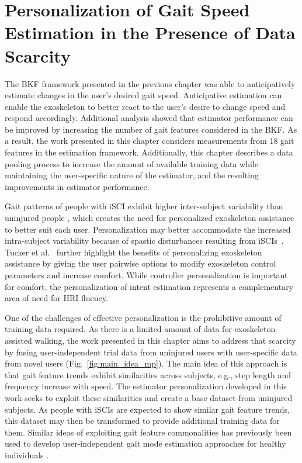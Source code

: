 \chapter{Personalization of Gait Speed Estimation in the Presence of Data Scarcity}\label{chapter:MP}

The BKF framework presented in the previous chapter was able to anticipatively estimate changes in the user's desired gait speed. Anticipative estimation can enable the exoskeleton to better react to the user's desire to change speed and respond accordingly. Additional analysis showed that estimator performance can be improved by increasing the number of gait features considered in the BKF. As a result, the work presented in this chapter considers measurements from 18 gait features in the estimation framework. Additionally, this chapter describes a data pooling process to increase the amount of available training data while maintaining the user-specific nature of the estimator, and the resulting improvements in estimator performance. 

Gait patterns of people with iSCI exhibit higher inter-subject variability than uninjured people \cite{sohn2018variability}, which creates the need for personalized exoskeleton assistance to better suit each user. Personalization may better accommodate the increased intra-subject variability because of spastic disturbances resulting from iSCIs~\cite{krawetz1996gait}. Tucker et al.~\cite{tucker2020preference} further highlight the benefits of personalizing exoskeleton assistance by giving the user pairwise options to modify exoskeleton control parameters and increase comfort. While controller personalization is important for comfort, the personalization of intent estimation represents a complementary area of need for HRI fluency.

One of the challenges of effective personalization is the prohibitive amount of training data required. As there is a limited amount of data for exoskeleton-assisted walking, the work presented in this chapter aims to address that scarcity by fusing user-independent trial data from uninjured users with user-specific data from novel users (Fig.~\ref{fig:main_idea_mp}).
The main idea of this approach is that gait feature trends exhibit similarities across subjects, e.g., step length and frequency increase with speed. The estimator personalization developed in this work seeks to exploit these similarities and create a base dataset from uninjured subjects. As people with iSCIs are expected to show similar gait feature trends, this dataset may then be transformed to provide additional training data for them. Similar ideas of exploiting gait feature commonalities has previously been used to develop user-independent gait mode estimation approaches for healthy individuals \cite{kilmartin2009optimising,ibrahim2008gait}. 

